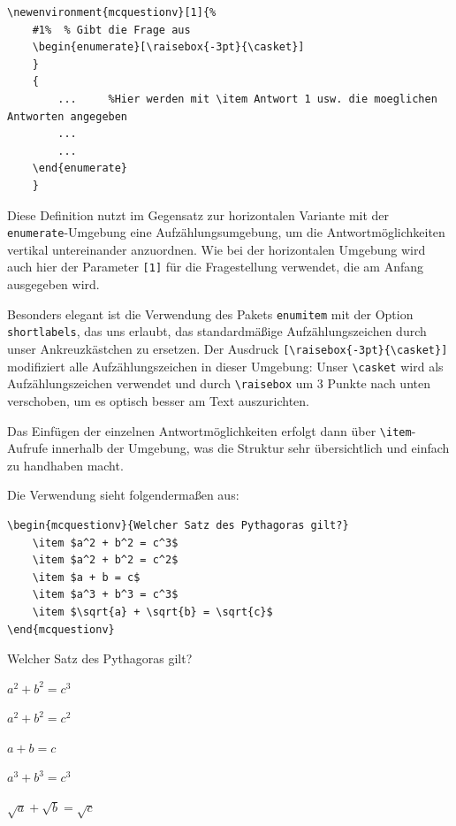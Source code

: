\begin{lstlisting}[style=latex]
% Umgebung fuer vertikale MC-Fragen
\newenvironment{mcquestionv}[1]{%
	#1%  % Gibt die Frage aus
	\begin{enumerate}[\raisebox{-3pt}{\casket}]
	}
  	{
		...		%Hier werden mit \item Antwort 1 usw. die moeglichen Antworten angegeben
		...
		...
	\end{enumerate}
	}
\end{lstlisting}

Diese Definition nutzt im Gegensatz zur horizontalen Variante mit der \texttt{enumerate}-Umgebung eine Aufzählungsumgebung, um die Antwortmöglichkeiten vertikal untereinander anzuordnen. Wie bei der horizontalen Umgebung wird auch hier der Parameter \texttt{[1]} für die Fragestellung verwendet, die am Anfang ausgegeben wird.

Besonders elegant ist die Verwendung des Pakets \texttt{enumitem} mit der Option \texttt{shortlabels}, das uns erlaubt, das standardmäßige Aufzählungszeichen durch unser Ankreuzkästchen zu ersetzen. Der Ausdruck \texttt{[\textbackslash raisebox\{-3pt\}\{\textbackslash casket\}]} modifiziert alle Aufzählungszeichen in dieser Umgebung: Unser \texttt{\textbackslash casket} wird als Aufzählungszeichen verwendet und durch \texttt{\textbackslash raisebox} um 3 Punkte nach unten verschoben, um es optisch besser am Text auszurichten.

Das Einfügen der einzelnen Antwortmöglichkeiten erfolgt dann über \texttt{\textbackslash item}-Aufrufe innerhalb der Umgebung, was die Struktur sehr übersichtlich und einfach zu handhaben macht.



Die Verwendung sieht folgendermaßen aus:

\begin{lstlisting}[style=latex]
\begin{mcquestionv}{Welcher Satz des Pythagoras gilt?}
	\item $a^2 + b^2 = c^3$
	\item $a^2 + b^2 = c^2$
	\item $a + b = c$
	\item $a^3 + b^3 = c^3$
	\item $\sqrt{a} + \sqrt{b} = \sqrt{c}$
\end{mcquestionv}
\end{lstlisting}

\begin{ausgabe}
\begin{mcquestionv}{Welcher Satz des Pythagoras gilt?}
 	\item $a^2 + b^2 = c^3$
  	\item $a^2 + b^2 = c^2$
  	\item $a + b = c$
  	\item $a^3 + b^3 = c^3$
  	\item $\sqrt{a} + \sqrt{b} = \sqrt{c}$
\end{mcquestionv}
\end{ausgabe}



